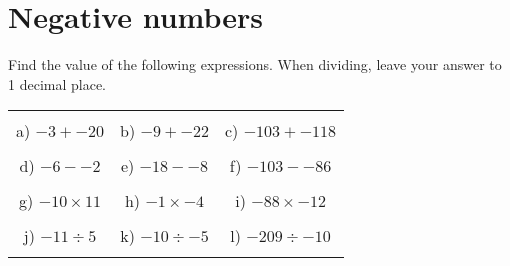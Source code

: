 \documentclass[12pt]{article}
\begin{document}
\pagestyle{fancy}
\fancyfoot{} 
\section{Negative numbers}
Find the value of the following expressions. When dividing, leave your answer to 1 decimal place.
\begin{table}[h!]
\centering
\begin{tabular}{c c c}
\hspace{5cm} & \hspace{5cm} & \hspace{5cm} \\
a) ${-3} + {-20}$ & b) ${-9} + {-22}$ & c) ${-103} + {-118}$ \\ \\
d) ${-6} - {-2}$ & e) ${-18} - {-8}$ & f) ${-103} - {-86}$ \\ \\
g) ${-10}\times{11}$ & h) ${-1}\times{-4}$ & i) ${-88}\times{-12}$ \\ \\
j) ${-11}\div{5}$ & k) ${-10}\div{-5}$ & l) ${-209}\div{-10}$ \\ \\
\end{tabular}
\end{table}
\newline
\end{document}
